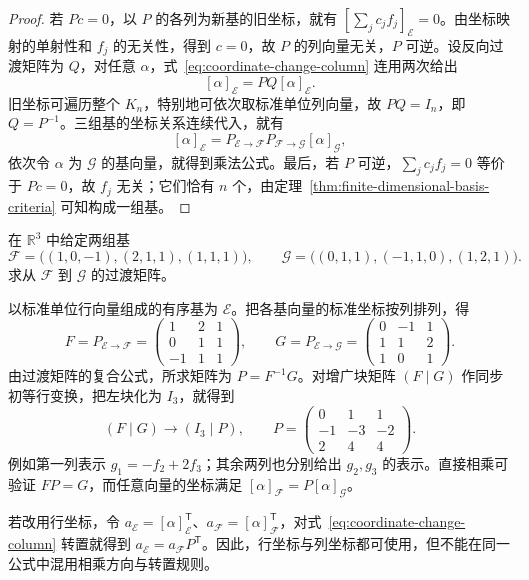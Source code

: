 \begin{proof}
若 $Pc=0$，以 $P$ 的各列为新基的旧坐标，就有 $[\sum_j c_jf_j]_{\mathcal E}=0$。由坐标映射的单射性和 $f_j$ 的无关性，得到 $c=0$，故 $P$ 的列向量无关，$P$ 可逆。设反向过渡矩阵为 $Q$，对任意 $\alpha$，式~\eqref{eq:coordinate-change-column} 连用两次给出
\[
    [\alpha]_{\mathcal E}=PQ[\alpha]_{\mathcal E}.
\]
旧坐标可遍历整个 $K_n$，特别地可依次取标准单位列向量，故 $PQ=I_n$，即 $Q=P^{-1}$。三组基的坐标关系连续代入，就有
\[
    [\alpha]_{\mathcal E}
    =P_{\mathcal E\to\mathcal F}P_{\mathcal F\to\mathcal G}[\alpha]_{\mathcal G},
\]
依次令 $\alpha$ 为 $\mathcal G$ 的基向量，就得到乘法公式。最后，若 $P$ 可逆，$\sum_jc_jf_j=0$ 等价于 $Pc=0$，故 $f_j$ 无关；它们恰有 $n$ 个，由定理~\ref{thm:finite-dimensional-basis-criteria} 可知构成一组基。
\end{proof}

\begin{example}
\label{ex:transition-matrix-computation}
在 $\mathbb R^3$ 中给定两组基
\[
    \mathcal F=\bigl((1,0,-1),(2,1,1),(1,1,1)\bigr),\qquad
    \mathcal G=\bigl((0,1,1),(-1,1,0),(1,2,1)\bigr).
\]
求从 $\mathcal F$ 到 $\mathcal G$ 的过渡矩阵。
\end{example}

\begin{solve}
以标准单位行向量组成的有序基为 $\mathcal E$。把各基向量的标准坐标按列排列，得
\[
    F=P_{\mathcal E\to\mathcal F}
     =\begin{pmatrix}1&2&1\\0&1&1\\-1&1&1\end{pmatrix},\qquad
    G=P_{\mathcal E\to\mathcal G}
     =\begin{pmatrix}0&-1&1\\1&1&2\\1&0&1\end{pmatrix}.
\]
由过渡矩阵的复合公式，所求矩阵为 $P=F^{-1}G$。对增广块矩阵 $(F\mid G)$ 作同步初等行变换，把左块化为 $I_3$，就得到
\[
    (F\mid G)\longrightarrow(I_3\mid P),\qquad
    P=\begin{pmatrix}0&1&1\\-1&-3&-2\\2&4&4\end{pmatrix}.
\]
例如第一列表示 $g_1=-f_2+2f_3$；其余两列也分别给出 $g_2,g_3$ 的表示。直接相乘可验证 $FP=G$，而任意向量的坐标满足 $[\alpha]_{\mathcal F}=P[\alpha]_{\mathcal G}$。
\end{solve}

若改用行坐标，令 $a_{\mathcal E}=[\alpha]_{\mathcal E}^{\mathsf T}$、$a_{\mathcal F}=[\alpha]_{\mathcal F}^{\mathsf T}$，对式~\eqref{eq:coordinate-change-column} 转置就得到 $a_{\mathcal E}=a_{\mathcal F}P^{\mathsf T}$。因此，行坐标与列坐标都可使用，但不能在同一公式中混用相乘方向与转置规则。

